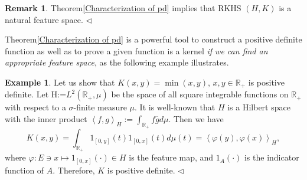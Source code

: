 \documentclass[a4paper,12pt]{article}
\theoremstyle{remark}
\theoremstyle{definition}
\newtheorem{rem}[thm]{Remark}
\theoremstyle{definition}
\newtheorem{ex}[thm]{Example}
\theoremstyle{definition}
\newcommand{\ip}[2]{\left<#1, #2 \right>}
\newcommand{\fin}{\hfill \( \triangleleft \) }
\begin{document}
\begin{rem}
	Theorem\ref{Characterization of pd} implies that RKHS \( (H,K) \) is a natural feature space.
	\fin\end{rem}

Theorem\ref{Characterization of pd} is a powerful tool to construct a positive definite function as well as to prove a given function is a kernel \textit{if we can find an appropriate feature space}, as the following example illustrates.
\begin{ex}
	Let us show that \( K(x,y) = \min(x,y),\,x,y \in \mathbb{R}_{+} \) is positive definite.
	Let H:=\( L^2(\mathbb{R}_{+}, \mu) \) be the space of all square integrable functions on \( \mathbb{R}_{+} \) with respect to a \( \sigma \)-finite measure \( \mu \). It is well-known that \( H \) is a Hilbert space with the inner product \( \ip{f}{g}_H := \int_{\mathbb{R}_{+}} f \overline{g} d \mu\). Then we have
	\begin{equation*}
		K(x,y) = \int_{\mathbb{R}_{+}} 1_{[0,y]}(t) 1_{[0,x]}(t) d \mu(t) = \ip{\varphi(y)}{\varphi(x)}_H,
	\end{equation*}
	where \( \varphi:E \ni x \mapsto 1_{[0,x]}(\cdot ) \in H \) is the feature map, and \( 1_A(\cdot ) \) is the indicator function of \( A \). Therefore, \( K \) is positive definite. \fin
\end{ex}
\end{document}
